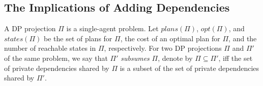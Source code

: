 \documentclass{article}
\newcommand{\psolve}{\ensuremath{P_{solve}}\xspace}
\newcommand{\rotem}[1]{\textbf{\color{red}[ROTEM:#1]}}
\theoremstyle{remark}
\begin{document}
\subsection{The Implications of Adding Dependencies}

A DP projection $\Pi$ is a single-agent problem. 
Let $plans(\Pi)$, $opt(\Pi)$, and $states(\Pi)$ be the set of plans for $\Pi$, the cost of an optimal plan for $\Pi$, and the number of reachable states in $\Pi$, respectively.  
For two DP projections $\Pi$ and $\Pi'$ of the same problem, we say that $\Pi'$ \emph{subsumes} $\Pi$, denote by $\Pi\subseteq \Pi'$, iff the set of private dependencies shared by $\Pi$ is a subset of the set of private dependencies shared by $\Pi'$. 



\end{document}
